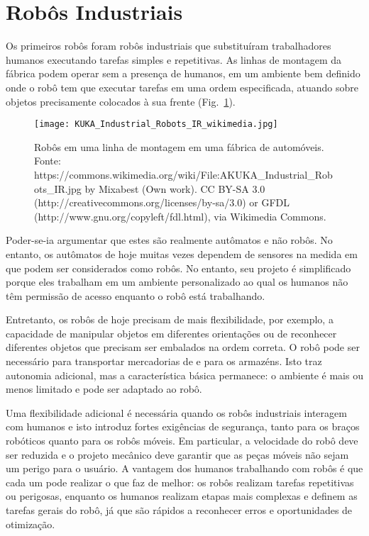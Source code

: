 \section{Robôs Industriais}

Os primeiros robôs foram robôs industriais que substituíram trabalhadores humanos executando tarefas simples e repetitivas. As linhas de montagem da fábrica podem operar sem a presença de humanos, em um ambiente bem definido onde o robô tem que executar tarefas em uma ordem especificada, atuando sobre objetos precisamente colocados à sua frente (Fig.~\ref{fig.assemblyline}). 

\begin{figure}
\begin{center}
\texttt{[image: KUKA\_Industrial\_Robots\_IR\_wikimedia.jpg]}
\end{center}
\caption{Robôs em uma linha de montagem em uma fábrica de automóveis. Fonte: https://commons.wikimedia.org/wiki/File:AKUKA\_Industrial\_Robots\_IR.jpg by Mixabest (Own work). CC BY-SA 3.0 (http://creativecommons.org/licenses/by-sa/3.0) or GFDL (http://www.gnu.org/copyleft/fdl.html), via Wikimedia Commons.}\label{fig.assemblyline}
\end{figure}

Poder-se-ia argumentar que estes são realmente autômatos e não robôs. No entanto, os autômatos de hoje muitas vezes dependem de sensores na medida em que podem ser considerados como robôs. No entanto, seu projeto é simplificado porque eles trabalham em um ambiente personalizado ao qual os humanos não têm permissão de acesso enquanto o robô está trabalhando.

Entretanto, os robôs de hoje precisam de mais flexibilidade, por exemplo, a capacidade de manipular objetos em diferentes orientações ou de reconhecer diferentes objetos que precisam ser embalados na ordem correta. O robô pode ser necessário para transportar mercadorias de e para os armazéns. Isto traz autonomia adicional, mas a característica básica permanece: o ambiente é mais ou menos limitado e pode ser adaptado ao robô.

Uma flexibilidade adicional é necessária quando os robôs industriais interagem com humanos e isto introduz fortes exigências de segurança, tanto para os braços robóticos quanto para os robôs móveis. Em particular, a velocidade do robô deve ser reduzida e o projeto mecânico deve garantir que as peças móveis não sejam um perigo para o usuário. A vantagem dos humanos trabalhando com robôs é que cada um pode realizar o que faz de melhor: os robôs realizam tarefas repetitivas ou perigosas, enquanto os humanos realizam etapas mais complexas e definem as tarefas gerais do robô, já que são rápidos a reconhecer erros e oportunidades de otimização.

